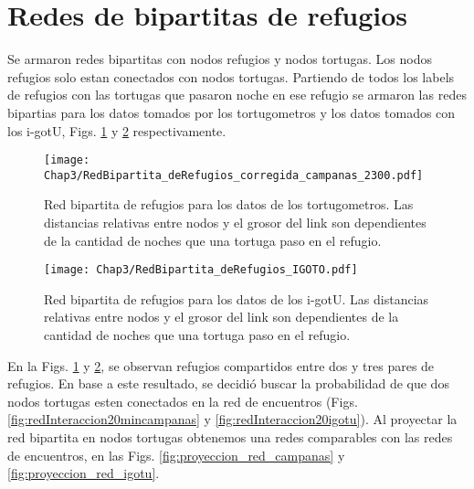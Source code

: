 \section{Redes  de bipartitas de refugios}
Se armaron redes bipartitas con nodos refugios y nodos tortugas. Los nodos refugios solo estan conectados con nodos tortugas.  Partiendo de todos los labels de refugios con las tortugas que pasaron noche en ese refugio se armaron las redes bipartias para los datos tomados por los tortugometros y los datos tomados con los i-gotU, Figs. \ref{fig:red_bipartita_refus_campanas} y \ref{fig:red_bipartita_refus_igotu} respectivamente.

\begin{figure}[ht]
    \begin{center}
        \texttt{[image: Chap3/RedBipartita\_deRefugios\_corregida\_campanas\_2300.pdf]}
        \caption[Red bipartita de refugios para los datos de los tortugometros.]{Red bipartita de refugios para los datos de los tortugometros. Las distancias relativas entre nodos y el grosor del link son dependientes de la cantidad de noches que una  tortuga paso en el refugio. } 
        \label{fig:red_bipartita_refus_campanas}
        
        \end{center}
\end{figure} 

\begin{figure}[ht]
    \begin{center}
        \texttt{[image: Chap3/RedBipartita\_deRefugios\_IGOTO.pdf]}
        \caption[Red bipartita de refugios para los datos de los i-gotU.]{Red bipartita de refugios para los datos de los i-gotU. Las distancias relativas entre nodos y el grosor del link son dependientes de la cantidad de noches que una  tortuga paso en el refugio. } 
        \label{fig:red_bipartita_refus_igotu}
        
        \end{center}
\end{figure} 
En la Figs. \ref{fig:red_bipartita_refus_campanas} y \ref{fig:red_bipartita_refus_igotu}, se observan refugios compartidos entre dos y tres pares de refugios.  En base a este resultado, se decidió buscar la probabilidad de que dos nodos tortugas esten conectados en la red de encuentros (Figs. \ref{fig:redInteraccion20mincampanas} y \ref{fig:redInteraccion20igotu}). Al proyectar la red bipartita en nodos tortugas obtenemos una redes comparables con las redes de encuentros, en las Figs. \ref{fig:proyeccion_red_campanas} y \ref{fig:proyeccion_red_igotu}.


